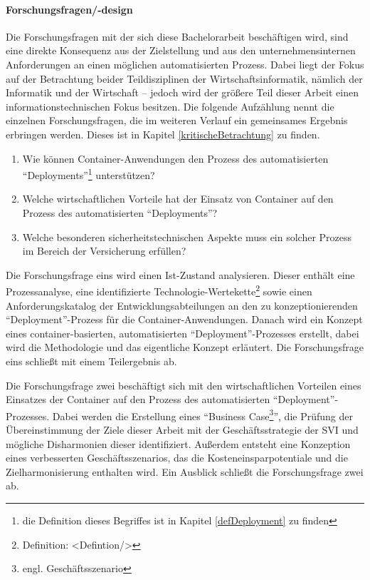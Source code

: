 \paragraph{Forschungsfragen/-design}
Die Forschungsfragen mit der sich diese Bachelorarbeit beschäftigen wird, sind eine direkte Konsequenz aus der Zielstellung und aus den unternehmensinternen Anforderungen an einen möglichen automatisierten Prozess. Dabei liegt der Fokus auf der Betrachtung beider Teildisziplinen der Wirtschaftsinformatik, nämlich der Informatik und der Wirtschaft -- jedoch wird der größere Teil dieser Arbeit einen informationstechnischen Fokus besitzen. Die folgende Aufzählung nennt die einzelnen Forschungsfragen, die im weiteren Verlauf ein gemeinsames Ergebnis erbringen werden. Dieses ist in Kapitel \vref{kritischeBetrachtung} zu finden.
\begin{enumerate}
	\item Wie können Container-Anwendungen den Prozess des automatisierten \enquote{Deployments}\footnote{die Definition dieses Begriffes ist in Kapitel \vref{defDeployment} zu finden} unterstützen?
	\item Welche wirtschaftlichen Vorteile hat der Einsatz von Container auf den Prozess des automatisierten \enquote{Deployments}?
	\item Welche besonderen sicherheitstechnischen Aspekte muss ein solcher Prozess im Bereich der Versicherung erfüllen?
\end{enumerate}
Die Forschungsfrage eins wird einen Ist-Zustand analysieren. Dieser enthält eine Prozessanalyse, eine identifizierte Technologie-Wertekette\footnote{Definition: <Defintion/>} sowie einen Anforderungskatalog der Entwicklungsabteilungen an den zu konzeptionierenden \enquote{Deployment}-Prozess für die Container-Anwendungen. Danach wird ein Konzept eines container-basierten, automatisierten \enquote{Deployment}-Prozesses erstellt, dabei wird die Methodologie und das eigentliche Konzept erläutert. Die Forschungsfrage eins schließt mit einem Teilergebnis ab. \par
Die Forschungsfrage zwei beschäftigt sich mit den wirtschaftlichen Vorteilen eines Einsatzes der Container auf den Prozess des automatisierten \enquote{Deployment}-Prozesses. Dabei werden die Erstellung eines \enquote{Business Case\footnote{engl. Geschäftsszenario}}, die Prüfung der Übereinstimmung der Ziele dieser Arbeit mit der Geschäftsstrategie der \ac{SVI} und mögliche Disharmonien dieser identifiziert. Außerdem entsteht eine Konzeption eines verbesserten Geschäftsszenarios, das die Kosteneinsparpotentiale und die Zielharmonisierung enthalten wird. Ein Ausblick schließt die Forschungsfrage zwei ab. \par
